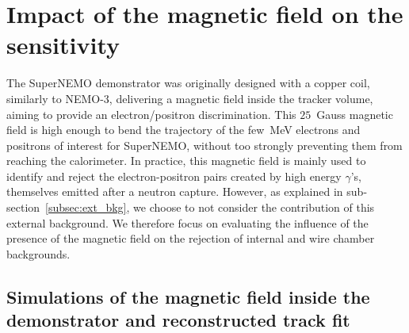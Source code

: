 \section{Impact of the magnetic field on the sensitivity}
\label{sec:magnetic_field}

The SuperNEMO demonstrator was originally designed with a copper coil, similarly to NEMO-$3$, delivering a magnetic field inside the tracker volume, aiming to provide an electron/positron discrimination.
This $25$~Gauss magnetic field is high enough to bend the trajectory of the few~MeV electrons and positrons of interest for SuperNEMO, without too strongly preventing them from reaching the calorimeter.
In practice, this magnetic field is mainly used to identify and reject the electron-positron pairs created by high energy $\gamma$’s, themselves emitted after a neutron capture.
However, as explained in sub-section~\ref{subsec:ext_bkg}, we choose to not consider the contribution of this external background.
We therefore focus on evaluating the influence of the presence of the magnetic field on the rejection of internal and wire chamber backgrounds.





\subsection{Simulations of the magnetic field inside the demonstrator and reconstructed track fit}

